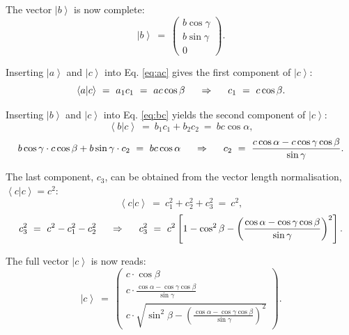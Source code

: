 The vector $\left| b \right>$ is now complete:
\begin{equation} 
\boxed{ \left| b \right> \ =\  \left( \begin{array}{c} b \cos \gamma \\ b \sin \gamma \\ 0 \end{array} \right). } 
\label{eq:bvec} 
\end{equation}


Inserting $\left| a \right>$ and $\left| c \right>$ into Eq. \ref{eq:ac} gives the first component of $\left| c \right>$:
\begin{equation} \left< a | c \right > \ =\  a_1 c_1 \ =\  ac \cos \beta
\hspace{0.5cm} \Rightarrow \hspace{0.5cm} c_1 \ =\  c \cos \beta.
\end{equation}



Inserting $\left| b \right>$ and $\left| c \right>$ into Eq. \ref{eq:bc} yields the second component of $\left| c \right>$:
\begin{equation} \left< b | c \right > \ =\  b_1 c_1 + b_2 c_2 \ =\  bc \cos \alpha, \end{equation}
\begin{equation} b \cos \gamma \cdot c \cos \beta + b \sin \gamma \cdot c_2 \ =\  bc \cos \alpha
	\hspace{0.5cm} \Rightarrow \hspace{0.5cm}
	c_2 \ =\  \frac{c \cos \alpha - c \cos \gamma \cos \beta}{\sin \gamma}. \end{equation}



The last component, $c_3$, can be obtained from the vector length normalisation, $ \left< c | c \right> = c^2 $:
\begin{equation} \left< c | c \right > \ =\  c_1^2 + c_2^2 + c_3^2 \ =\  c^2, \end{equation}
\begin{equation} c_3^2 \ =\  c^2 - c_1^2 - c_2^2
	\hspace{0.5cm} \Rightarrow \hspace{0.5cm}
	c_3^2 \ =\  c^2 \left[1 - \cos^2 \beta - \left(\frac{\cos \alpha - \cos \gamma \cos \beta}{\sin \gamma} \right)^2 \right].
\end{equation}

The full vector $\left| c \right>$ is now reads:
\begin{equation} \boxed{ \left| c \right> \ =\  \left( \begin{array}{c}
	c \cdot \cos \beta \\
	c \cdot \frac{\cos \alpha - \cos \gamma \cos \beta}{\sin \gamma} \\
	c \cdot \sqrt{ \sin^2 \beta - \left(\frac{\cos \alpha - \cos \gamma \cos \beta}{\sin \gamma} \right)^2 }
\end{array} \right). } \end{equation}



